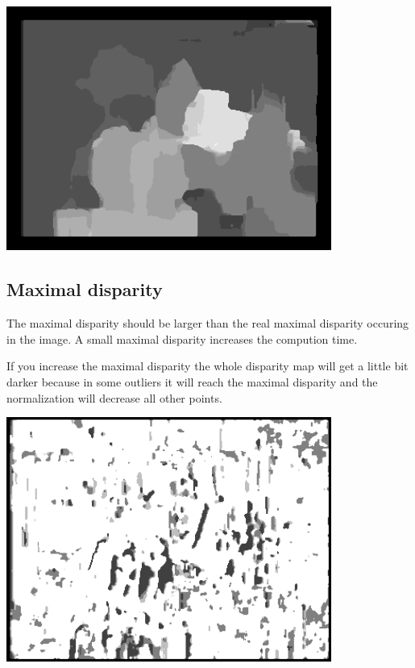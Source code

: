 \documentclass[a4paper]{scrartcl}
\begin{document}
\vspace{1cm}
\begin{minipage}{0.8\textwidth}
  \centering
  \includegraphics[width=0.8\textwidth]{images/disparity-r16-ssd-d20-m1.png}
  \label{fig:disparity-r16-ssd-d20-m1}
\end{minipage}


\subsection{Maximal disparity}

The maximal disparity should be larger than the real maximal disparity
occuring in the image. A small maximal disparity increases the compution time.

If you increase the maximal disparity the whole disparity map will get a
little bit darker because in some outliers it will reach the maximal disparity
and the normalization will decrease all other points.

\vspace{1cm}
\begin{minipage}{0.8\textwidth}
  \centering
  \includegraphics[width=0.8\textwidth]{images/disparity-r3-ssd-d4-m1.png}
  \label{fig:disparity-r3-ssd-d4-m1}
\end{minipage}
\end{document}

